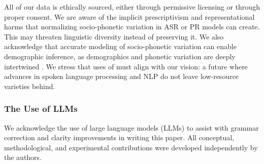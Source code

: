 All of our data is ethically sourced, either through permissive licensing or through proper consent.
We are aware of the implicit prescriptivism and representational harms \citep{crawford} that normalizing socio-phonetic variation in ASR or PR models can create.
This may threaten linguistic diversity instead of preserving it.
We also acknowledge that accurate modeling of socio-phonetic variation can enable demographic inference, as demographics and phonetic variation are deeply intertwined \citep{labov1963social}.
We stress that uses of \POWSM must align with our vision: a future where advances in spoken language processing and NLP do not leave low-resource varieties behind.


\subsubsection*{The Use of LLMs}
We acknowledge the use of large language models (LLMs) to assist with grammar correction and clarity improvements in writing this paper. All conceptual, methodological, and experimental contributions were developed independently by the authors.
